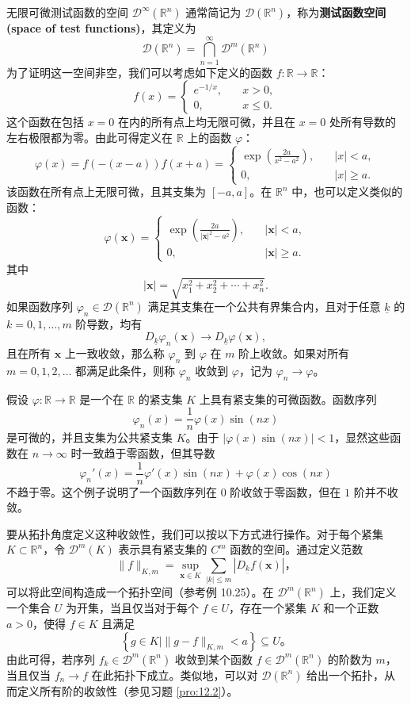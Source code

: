 无限可微测试函数的空间 $\mathcal{D}^\infty(\mathbb{R}^n)$ 通常简记为
$\mathcal{D}(\mathbb{R}^n)$，称为\textbf{测试函数空间(space of test functions)}，其定义为
$$
\mathcal{D}(\mathbb{R}^n) = \bigcap_{n=1}^\infty \mathcal{D}^m(\mathbb{R}^n)
$$
为了证明这一空间非空，我们可以考虑如下定义的函数
$f: \mathbb{R} \rightarrow \mathbb{R}$：
$$
f(x) =
\begin{cases}
e^{-1 / x}, & \quad x > 0, \\
0, & \quad x \leq 0.
\end{cases}
$$
这个函数在包括 $x=0$ 在内的所有点上均无限可微，并且在 $x=0$
处所有导数的左右极限都为零。由此可得定义在 $\mathbb{R}$ 上的函数
$\varphi$：
$$
\varphi(x) = f(-(x-a)) f(x+a) =
\begin{cases}
\exp\left(\frac{2a}{x^2 - a^2}\right), & \quad |x| < a, \\
0, & \quad |x| \geq a.
\end{cases}
$$
该函数在所有点上无限可微，且其支集为 $[-a, a]$。在 $\mathbb{R}^n$
中，也可以定义类似的函数：
$$
\varphi(\mathbf{x}) =
\begin{cases}
\exp\left(\frac{2a}{|\mathbf{x}|^2 - a^2}\right), & \quad |\mathbf{x}| < a, \\
0, & \quad |\mathbf{x}| \geq a.
\end{cases}
$$
其中
$$
|\mathbf{x}| = \sqrt{x_1^2 + x_2^2 + \cdots + x_n^2}.
$$
如果函数序列 $\varphi_n \in \mathcal{D}(\mathbb{R}^n)$
满足其支集在一个公共有界集合内，且对于任意 $\underline{k}$ 的
$k=0, 1, \ldots, m$ 阶导数，均有
$$
D_{\underline{k}} \varphi_n(\mathbf{x}) \to D_{\underline{k}} \varphi(\mathbf{x}),
$$
且在所有 $\mathbf{x}$ 上一致收敛，那么称 $\varphi_n$ 到 $\varphi$
在 $m$ 阶上收敛。如果对所有 $m=0,1,2,\ldots$ 都满足此条件，则称
$\varphi_n$ 收敛到 $\varphi$，记为 $\varphi_n \to \varphi$。
\begin{eg}
  假设 $\varphi: \mathbb{R} \to \mathbb{R}$ 是一个在
$\mathbb{R}$ 的紧支集 $K$ 上具有紧支集的可微函数。函数序列
$$
\varphi_n(x) = \frac{1}{n} \varphi(x) \sin(nx)
$$
是可微的，并且支集为公共紧支集 $K$。由于
$|\varphi(x) \sin(nx)| < 1$，显然这些函数在 $n \to \infty$
时一致趋于零函数，但其导数
$$
\varphi_n'(x) = \frac{1}{n} \varphi'(x) \sin(nx) + \varphi(x) \cos(nx)
$$
不趋于零。这个例子说明了一个函数序列在 $0$ 阶收敛于零函数，但在 $1$
阶并不收敛。
\end{eg}

要从拓扑角度定义这种收敛性，我们可以按以下方式进行操作。对于每个紧集
$K \subset \mathbb{R}^n$，令 $\mathcal{D}^m(K)$ 表示具有紧支集的
$C^m$ 函数的空间。通过定义范数
$$
\|f\|_{K, m} = \sup_{\mathbf{x} \in K} \sum_{\mid \underline{k} \mid \leq m}\left|D_{\underline{k}} f(\mathbf{x})\right|，
$$
可以将此空间构造成一个拓扑空间（参考例 10.25）。在
$\mathcal{D}^m(\mathbb{R}^n)$ 上，我们定义一个集合 $U$
为开集，当且仅当对于每个 $f \in U$，存在一个紧集 $K$ 和一个正数
$a > 0$，使得 $f \in K$ 且满足
$$
\left\{g \in K \mid \|g - f\|_{K, m} < a\right\} \subseteq U。
$$
由此可得，若序列 $f_k \in \mathcal{D}^m(\mathbb{R}^n)$ 收敛到某个函数
$f \in \mathcal{D}^m(\mathbb{R}^n)$ 的阶数为 $m$，当且仅当
$f_n \to f$ 在此拓扑下成立。类似地，可以对
$\mathcal{D}(\mathbb{R}^n)$
给出一个拓扑，从而定义所有阶的收敛性（参见习题 \ref{pro:12.2}）。


